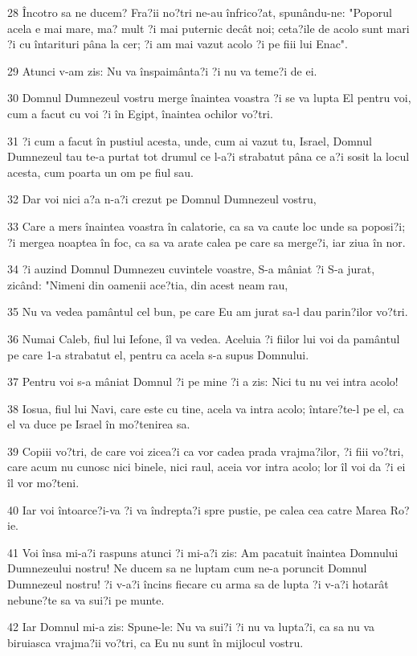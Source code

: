 \par 28 Încotro sa ne ducem? Fra?ii no?tri ne-au înfrico?at, spunându-ne: "Poporul acela e mai mare, ma? mult ?i mai puternic decât noi; ceta?ile de acolo sunt mari ?i cu întarituri pâna la cer; ?i am mai vazut acolo ?i pe fiii lui Enac".
\par 29 Atunci v-am zis: Nu va înspaimânta?i ?i nu va teme?i de ei.
\par 30 Domnul Dumnezeul vostru merge înaintea voastra ?i se va lupta El pentru voi, cum a facut cu voi ?i în Egipt, înaintea ochilor vo?tri.
\par 31 ?i cum a facut în pustiul acesta, unde, cum ai vazut tu, Israel, Domnul Dumnezeul tau te-a purtat tot drumul ce l-a?i strabatut pâna ce a?i sosit la locul acesta, cum poarta un om pe fiul sau.
\par 32 Dar voi nici a?a n-a?i crezut pe Domnul Dumnezeul vostru,
\par 33 Care a mers înaintea voastra în calatorie, ca sa va caute loc unde sa poposi?i; ?i mergea noaptea în foc, ca sa va arate calea pe care sa merge?i, iar ziua în nor.
\par 34 ?i auzind Domnul Dumnezeu cuvintele voastre, S-a mâniat ?i S-a jurat, zicând: "Nimeni din oamenii ace?tia, din acest neam rau,
\par 35 Nu va vedea pamântul cel bun, pe care Eu am jurat sa-l dau parin?ilor vo?tri.
\par 36 Numai Caleb, fiul lui Iefone, îl va vedea. Aceluia ?i fiilor lui voi da pamântul pe care 1-a strabatut el, pentru ca acela s-a supus Domnului.
\par 37 Pentru voi s-a mâniat Domnul ?i pe mine ?i a zis: Nici tu nu vei intra acolo!
\par 38 Iosua, fiul lui Navi, care este cu tine, acela va intra acolo; întare?te-l pe el, ca el va duce pe Israel în mo?tenirea sa.
\par 39 Copiii vo?tri, de care voi zicea?i ca vor cadea prada vrajma?ilor, ?i fiii vo?tri, care acum nu cunosc nici binele, nici raul, aceia vor intra acolo; lor îl voi da ?i ei îl vor mo?teni.
\par 40 Iar voi întoarce?i-va ?i va îndrepta?i spre pustie, pe calea cea catre Marea Ro?ie.
\par 41 Voi însa mi-a?i raspuns atunci ?i mi-a?i zis: Am pacatuit înaintea Domnului Dumnezeului nostru! Ne ducem sa ne luptam cum ne-a poruncit Domnul Dumnezeul nostru! ?i v-a?i încins fiecare cu arma sa de lupta ?i v-a?i hotarât nebune?te sa va sui?i pe munte.
\par 42 Iar Domnul mi-a zis: Spune-le: Nu va sui?i ?i nu va lupta?i, ca sa nu va biruiasca vrajma?ii vo?tri, ca Eu nu sunt în mijlocul vostru.
